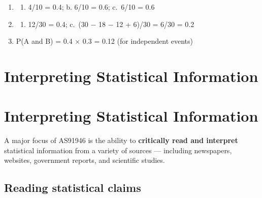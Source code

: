 \documentclass[
  11pt,
  a4paper,
  oneside,
  open=any]{scrbook}
\providecommand{\tightlist}{%
  \setlength{\itemsep}{0pt}\setlength{\parskip}{0pt}}
\begin{document}
\begin{tcolorbox}[enhanced jigsaw, breakable, leftrule=.75mm, bottomtitle=1mm, bottomrule=.15mm, titlerule=0mm, left=2mm, opacitybacktitle=0.6, coltitle=black, colbacktitle=quarto-callout-note-color!10!white, rightrule=.15mm, title=\textcolor{quarto-callout-note-color}{\faInfo}\hspace{0.5em}{Answers}, toptitle=1mm, arc=.35mm, colback=white, toprule=.15mm, colframe=quarto-callout-note-color-frame, opacityback=0]

\begin{enumerate}
\def\labelenumi{\arabic{enumi}.}
\tightlist
\item
  \begin{enumerate}
  \def\labelenumii{\alph{enumii}.}
  \tightlist
  \item
    4/10 = 0.4; b. 6/10 = 0.6; c.~6/10 = 0.6
  \end{enumerate}
\item
  \begin{enumerate}
  \def\labelenumii{\alph{enumii}.}
  \setcounter{enumii}{1}
  \tightlist
  \item
    12/30 = 0.4; c.~(30 − 18 − 12 + 6)/30 = 6/30 = 0.2
  \end{enumerate}
\item
  P(A and B) = 0.4 × 0.3 = 0.12 (for independent events)
\end{enumerate}

\end{tcolorbox}


\chapter{Interpreting Statistical
Information}\label{interpreting-statistical-information}


\chapter{Interpreting Statistical Information}\label{sec-inference}

A major focus of AS91946 is the ability to \textbf{critically read and
interpret} statistical information from a variety of sources ---
including newspapers, websites, government reports, and scientific
studies.

\section{Reading statistical claims}\label{reading-statistical-claims}
\end{document}
